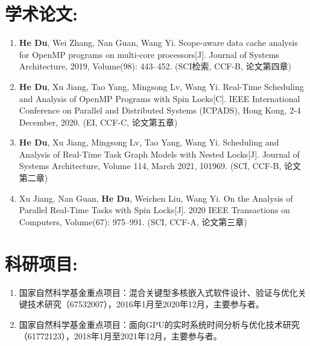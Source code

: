 {    \section*{学术论文:}
    \begin{enumerate}[leftmargin=*]
        \item \textbf{He Du}, Wei Zhang, Nan Guan, Wang Yi. Scope-aware data cache analysis for OpenMP programs on multi-core processors[J]. Journal of Systems Architecture, 2019, Volume(98): 443--452. (SCI检索, CCF-B, 论文第四章)
        \item \textbf{He Du}, Xu Jiang, Tao Yang, Mingsong Lv, Wang Yi. Real-Time Scheduling and Analysis of OpenMP Programs with Spin Locks[C]. IEEE International Conference on Parallel and Distributed Systems (ICPADS), Hong Kong, 2-4 December, 2020. (EI, CCF-C, 论文第五章)
        \item \textbf{He Du}, Xu Jiang, Mingsong Lv, Tao Yang, Wang Yi. Scheduling and Analysis of Real-Time Task Graph Models with Nested Locks[J]. Journal of Systems Architecture, Volume 114, March 2021, 101969. (SCI, CCF-B, 论文第二章)
        \item Xu Jiang, Nan Guan, \textbf{He Du},  Weichen Liu, Wang Yi. On the Analysis of Parallel Real-Time Tasks with Spin Locks[J]. 2020 IEEE Transactions on Computers, Volume(67): 975--991. (SCI, CCF-A, 论文第三章)

    \end{enumerate}
}

\section*{科研项目:}

\begin{enumerate}[leftmargin=*]
    \item 国家自然科学基金重点项目：混合关键型多核嵌入式软件设计、验证与优化关键技术研究（67532007），2016年1月至2020年12月，主要参与者。
    \item 国家自然科学基金重点项目：面向GPU的实时系统时间分析与优化技术研究（61772123），2018年1月至2021年12月，主要参与者。
\end{enumerate}


\cleardoublepage[plain]%

